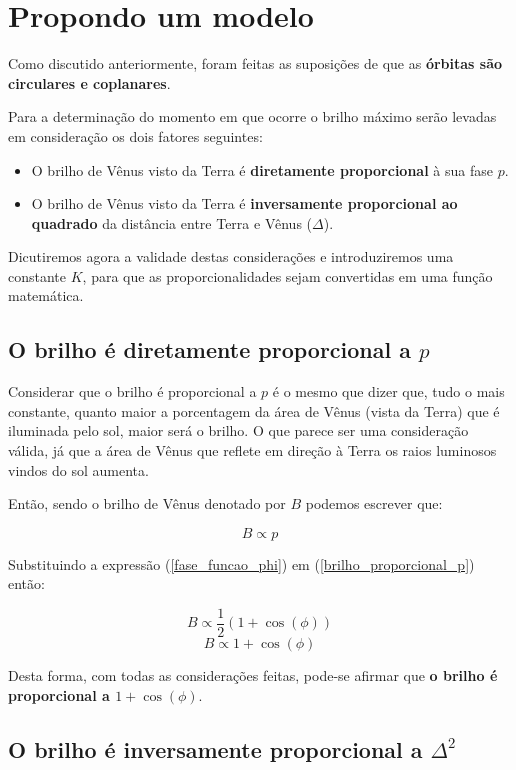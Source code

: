 \documentclass[a4paper, 12pt]{article}
\begin{document}
\section{Propondo um modelo}

Como discutido anteriormente, foram feitas as suposições de que as \textbf{órbitas são circulares e coplanares}.

Para a determinação do momento em que ocorre o brilho máximo serão levadas em consideração os dois fatores seguintes:

\begin{itemize}
  \item O brilho de Vênus visto da Terra é \textbf{diretamente proporcional} à sua fase $p$. 
  \item O brilho de Vênus visto da Terra é \textbf{inversamente proporcional ao quadrado} da distância entre Terra e Vênus ($\Delta$).
\end{itemize}

Dicutiremos agora a validade destas considerações e introduziremos uma constante $K$, para que as proporcionalidades sejam convertidas em uma função matemática.

\subsection{O brilho é diretamente proporcional a $p$}

Considerar que o brilho é proporcional a $p$ é o mesmo que dizer que, tudo o mais constante, quanto maior a porcentagem da área de Vênus (vista da Terra) que é iluminada pelo sol, maior será o brilho. O que parece ser uma consideração válida, já que a área de Vênus que reflete em direção à Terra os raios luminosos vindos do sol aumenta.

Então, sendo o brilho de Vênus denotado por $B$ podemos escrever que:

\begin{equation}\label{brilho_proporcional_p}
    B\propto p
\end{equation}

Substituindo a expressão (\ref{fase_funcao_phi}) em (\ref{brilho_proporcional_p}) então:

$$B\propto \frac{1}{2}\left(1+\cos \left(\phi \right)\right)$$
$$B\propto 1+\cos \left(\phi \right)$$

Desta forma, com todas as considerações feitas, pode-se afirmar que \textbf{o brilho é proporcional a $1+\cos \left(\phi \right)$}.

\subsection{O brilho é inversamente proporcional a $\Delta ^2$}
\end{document}
